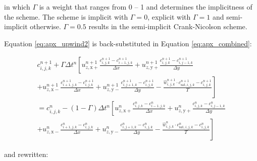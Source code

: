 \noindent in which $\Gamma$ is a weight that ranges from 0 -- 1 and
determines the implicitness of the scheme. The scheme is implicit with
$\Gamma = 0$, explicit with $\Gamma = 1$ and semi-implicit
otherwise. $\Gamma = 0.5$ results in the semi-implicit Crank-Nicolson
scheme.

Equation \ref{eq:apx_upwind2} is back-substituted in Equation
\ref{eq:apx_combined}:

\begin{multline}
  \label{eq:apx_combined_substituted}
  c^{n+1}_{i,j,k} + \Gamma \Delta t^n \left[ 
  u^{n+1}_{z,\mathrm{x+}} \frac{c^{n+1}_{i,j,k} - c^{n+1}_{i-1,j,k}}{\Delta x} + 
  u^{n+1}_{z,\mathrm{y+}} \frac{c^{n+1}_{i,j,k} - c^{n+1}_{i,j-1,k}}{\Delta y} \right. \\ + \left.
  u^{n+1}_{z,\mathrm{x-}} \frac{c^{n+1}_{i+1,j,k} - c^{n+1}_{i,j,k}}{\Delta x} + 
  u^{n+1}_{z,\mathrm{y-}} \frac{c^{n+1}_{i,j+1,k} - c^{n+1}_{i,j,k}}{\Delta y} -
  \frac{\hat{w}^{n+1}_{i,j,k} \cdot c^{n+1}_{\mathrm{sat},i,j,k} - c^{n+1}_{i,j,k}}{T} \right] \\ =
  c^n_{i,j,k} - (1 - \Gamma) \Delta t^n \left[ 
  u^n_{z,\mathrm{x+}} \frac{c^n_{i,j,k} - c^n_{i-1,j,k}}{\Delta x} + 
  u^n_{z,\mathrm{y+}} \frac{c^n_{i,j,k} - c^n_{i,j-1,k}}{\Delta y} \right. \\ + \left.
  u^n_{z,\mathrm{x-}} \frac{c^n_{i+1,j,k} - c^n_{i,j,k}}{\Delta x} + 
  u^n_{z,\mathrm{y-}} \frac{c^n_{i,j+1,k} - c^n_{i,j,k}}{\Delta y} -
  \frac{\hat{w}^n_{i,j,k} \cdot c^n_{\mathrm{sat},i,j,k} - c^n_{i,j,k}}{T} \right]
\end{multline}

\noindent and rewritten:


